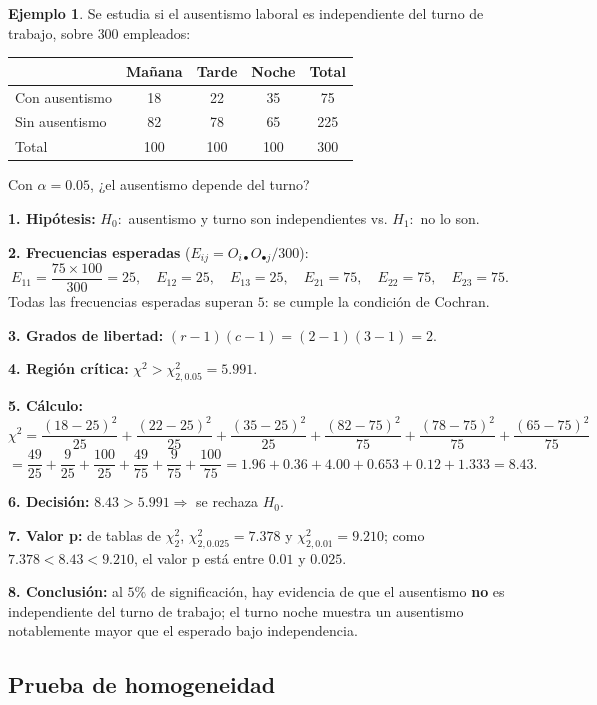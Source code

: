 \documentclass[11pt,a4paper]{article}
\theoremstyle{plain}
\theoremstyle{definition}
\newtheorem{ejemplo}[teorema]{Ejemplo}
\theoremstyle{remark}
\begin{document}
\begin{ejemplo}
Se estudia si el ausentismo laboral es independiente del turno de trabajo, sobre $300$ empleados:
\begin{center}
\begin{tabular}{@{}lccc|c@{}}
\toprule
 & Mañana & Tarde & Noche & Total \\
\midrule
Con ausentismo & 18 & 22 & 35 & 75 \\
Sin ausentismo & 82 & 78 & 65 & 225 \\
\midrule
Total & 100 & 100 & 100 & 300 \\
\bottomrule
\end{tabular}
\end{center}
Con $\alpha=0.05$, ¿el ausentismo depende del turno?

\textbf{1. Hipótesis:} $H_0:$ ausentismo y turno son independientes vs. $H_1:$ no lo son.

\textbf{2. Frecuencias esperadas} ($E_{ij}=O_{i\bullet}O_{\bullet j}/300$):
\[
E_{11}=\frac{75\times100}{300}=25,\quad E_{12}=25,\quad E_{13}=25,\quad E_{21}=75,\quad E_{22}=75,\quad E_{23}=75.
\]
Todas las frecuencias esperadas superan $5$: se cumple la condición de Cochran.

\textbf{3. Grados de libertad:} $(r-1)(c-1)=(2-1)(3-1)=2$.

\textbf{4. Región crítica:} $\chi^2>\chi^2_{2,0.05}=5.991$.

\textbf{5. Cálculo:}
\[
\chi^2=\frac{(18-25)^2}{25}+\frac{(22-25)^2}{25}+\frac{(35-25)^2}{25}+\frac{(82-75)^2}{75}+\frac{(78-75)^2}{75}+\frac{(65-75)^2}{75}
\]
\[
=\frac{49}{25}+\frac{9}{25}+\frac{100}{25}+\frac{49}{75}+\frac{9}{75}+\frac{100}{75}=1.96+0.36+4.00+0.653+0.12+1.333=8.43.
\]

\textbf{6. Decisión:} $8.43>5.991\Rightarrow$ se rechaza $H_0$.

\textbf{7. Valor p:} de tablas de $\chi^2_2$, $\chi^2_{2,0.025}=7.378$ y $\chi^2_{2,0.01}=9.210$; como $7.378<8.43<9.210$, el valor p está entre $0.01$ y $0.025$.

\textbf{8. Conclusión:} al $5\%$ de significación, hay evidencia de que el ausentismo \textbf{no} es independiente del turno de trabajo; el turno noche muestra un ausentismo notablemente mayor que el esperado bajo independencia.
\end{ejemplo}

\subsection{Prueba de homogeneidad}
\end{document}
